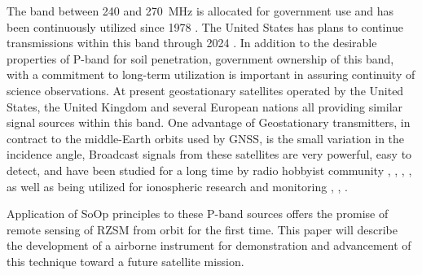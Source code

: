 \documentclass[draftcls,onecolumn]{IEEEtran}  %
\begin{document}
The band between 240 and 270~MHz is allocated for government use and has been continuously utilized since 1978 \cite{Oetting2012}.
The United States has plans to continue transmissions within this band through 2024 \cite{Medina2012}. 
In addition to the desirable properties of P-band for soil penetration, government ownership of this band, with a commitment to long-term utilization is important in assuring continuity of science observations.
At present geostationary satellites operated by the United States, the United Kingdom \cite{Wookey2008} and several European nations \cite{LUGINBUHL1963} \cite{sicral} all providing similar signal sources within this band. 
One advantage of Geostationary transmitters, in contract to the middle-Earth orbits used by GNSS, is the small variation in the incidence angle,  
 Broadcast signals from these satellites are very powerful, easy to detect, and have been studied for a long time by radio hobbyist community  \cite{monitoringtimes}, \cite{uhfsatcom}, \cite{uhf-german}, \cite{czech-uhf}, as well as being utilized for ionospheric research and monitoring \cite{Groves1997}, \cite{RamaRao2005}, \cite{Olwendo2013a}.
 
 Application of SoOp principles to these P-band sources offers the promise of remote sensing of RZSM from orbit for the first time.  
 This paper will describe the development of a airborne instrument for demonstration and advancement of this technique toward a future satellite mission.  
 
\end{document}
